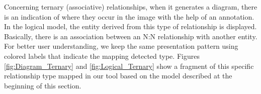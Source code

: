 Concerning ternary (associative) relationships, when it generates a diagram, there is an indication of where they occur in the image with the help of an annotation.
In the logical model, the entity derived from this type of relationship is displayed.
Basically, there is an association between an N:N relationship with another entity.
For better user understanding, we keep the same presentation pattern using colored labels that indicate the mapping detected type.
Figures \ref{fig:Diagram_Ternary} and \ref{fig:Logical_Ternary} show a fragment of this specific relationship type mapped in our tool based on the model described at the beginning of this section.

